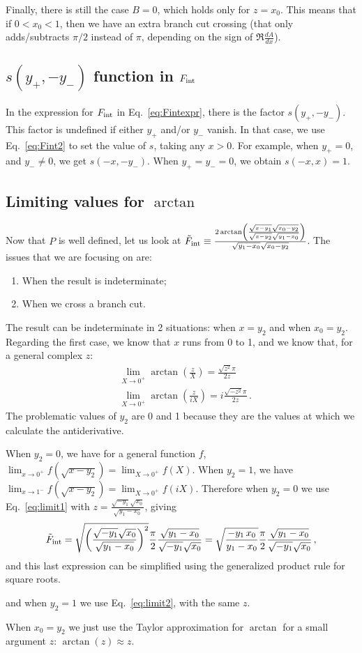 \documentclass[twoside]{article}
\begin{document}
Finally, there is still the case $B=0$, which holds only for $z=x_0$. This means that if $0<x_0<1$, then we have an extra branch cut crossing (that only adds/subtracts $\pi/2$ instead of $\pi$, depending on the sign of $\Re \frac{dA}{dx}$). 




\subsection{$s(y_+,-y_-)$ function in $F_{\rm int}$}

In the expression for $F_{\rm int}$ in Eq.~\eqref{eq:Fintexpr}, there is the factor $s(y_+,-y_-)$. This factor is undefined if either $y_+$ and/or $y_-$ vanish. In that case, we use Eq.~\eqref{eq:Fint2} to set the value of $s$, taking any $x>0$. For example, when $y_+=0$, and $y_- \neq 0$, we get $s(-x, -y_-)$. When $y_+=y_-=0$, we obtain $s(-x, x)=1$.

\subsection{Limiting values for $\arctan$}

Now that $P$ is well defined, let us look at $\tilde{F}_{\rm int} \equiv \frac{2 \arctan\left(\frac{\sqrt{x-y_1} \sqrt{x_0-y_2}}{\sqrt{x-y_2} \sqrt{y_1-x_0}}\right)}{\sqrt{y_1 - x_0}\sqrt{x_0 - y_2}}$. The issues that we are focusing on are:
\begin{enumerate}
\item When the result is indeterminate;
\item When we cross a branch cut.
\end{enumerate}

The result can be indeterminate in 2 situations: when $x=y_2$ and when $x_0 = y_2$.
Regarding the first case, we know that $x$ runs from 0 to 1, and we know that, for a general complex $z$:
\begin{align}
&\lim_{X \to 0^+} \arctan\left(\frac{z}{X}\right) = \frac{\sqrt{z^2}\pi}{2 z} \label{eq:limit1}\\
&\lim_{X \to 0^+} \arctan\left(\frac{z}{i X}\right) = i \frac{\sqrt{-z^2}\pi}{2 z}\,. \label{eq:limit2}
\end{align} 
The problematic values of $y_2$ are 0 and 1 because they are the values at which we calculate the antiderivative. 

When $y_2 = 0$, we have for a general function $f$, $\lim_{x \to 0^+} f(\sqrt{x-y_2}) = \lim_{X \to 0^+} f(X)$. 
When $y_2 = 1$, we have $\lim_{x \to 1^-} f(\sqrt{x-y_2}) = \lim_{X \to 0^+} f(i X)$. 
Therefore when $y_2 = 0$ we use Eq.~\eqref{eq:limit1} with $z = \frac{\sqrt{-y_1} \sqrt{x_0}}{\sqrt{y_1-x_0}}$, giving 
\begin{equation}
\tilde{F}_{\rm int} = \sqrt{\left(\frac{\sqrt{-y_1} \sqrt{x_0}}{\sqrt{y_1-x_0}}\right)^2}\frac{\pi}{2}\frac{\sqrt{y_1-x_0}}{\sqrt{-y_1} \sqrt{x_0}}= \sqrt{\frac{-y_1\, x_0}{y_1-x_0}}\frac{\pi}{2}\frac{\sqrt{y_1-x_0}}{\sqrt{-y_1} \sqrt{x_0}}\,,
\end{equation}
and this last expression can be simplified using the generalized product rule for square roots.



 and when $y_2 = 1$ we use Eq.~\eqref{eq:limit2}, with the same $z$.

When $x_0 = y_2$ we just use the Taylor approximation for $\arctan$ for a small argument $z$: $\arctan(z) \approx z$.
\end{document}
